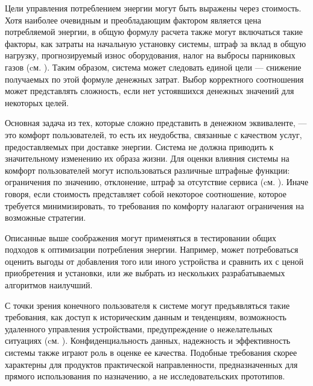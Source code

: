Цели управления потреблением энергии могут быть выражены через стоимость. Хотя наиболее очевидным и преобладающим фактором является цена потребляемой энергии, в общую формулу расчета также могут включаться такие факторы, как затраты на начальную установку системы, штраф за вклад в общую нагрузку, прогнозируемый износ оборудования, налог на выбросы парниковых газов (cм. ). Таким образом, система может следовать единой цели — снижение получаемых по этой формуле денежных затрат. Выбор корректного соотношения может представлять сложность, если нет устоявшихся денежных значений для некоторых целей.

Основная задача из тех, которые сложно представить в денежном эквиваленте, — это комфорт пользователей, то есть их неудобства, связанные с качеством услуг, предоставляемых при доставке энергии. Система не должна приводить к значительному изменению их образа жизни. Для оценки влияния системы на комфорт пользователей могут использоваться различные штрафные функции: ограничения по значению, отклонение, штраф за отсутствие сервиса (cм. ). Иначе говоря, если стоимость представляет собой некоторое соотношение, которое требуется минимизировать, то требования по комфорту налагают ограничения на возможные стратегии.

Описанные выше соображения могут применяться в тестировании общих подходов к оптимизации потребления энергии. Например, может потребоваться оценить выгоды от добавления того или иного устройства и сравнить их с ценой приобретения и установки, или же выбрать из нескольких разрабатываемых алгоритмов наилучший.

С точки зрения конечного пользователя к системе могут предъявляться такие требования, как доступ к историческим данным и тенденциям, возможность удаленного управления устройствами, предупреждение о нежелательных ситуациях  (cм. ). Конфиденциальность данных, надежность и эффективность системы также играют роль в оценке ее качества. Подобные требования скорее характерны для продуктов практической направленности, предназначенных для прямого использования по назначению, а не исследовательских прототипов.

